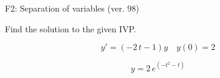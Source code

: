 \begin{exercise}
  \begin{exerciseTitle}F2: Separation of variables (ver. 98)\end{exerciseTitle}
  \begin{exerciseStatement}
    
Find the solution to the given IVP.

    
\[y'=( -2 \, t - 1 )y\hspace{1em} y(0)= 2\]

  \end{exerciseStatement}
  \begin{exerciseAnswer}
    
\[y= 2 \, e^{\left(-t^{2} - t\right)}\]

  \end{exerciseAnswer}
\end{exercise}
